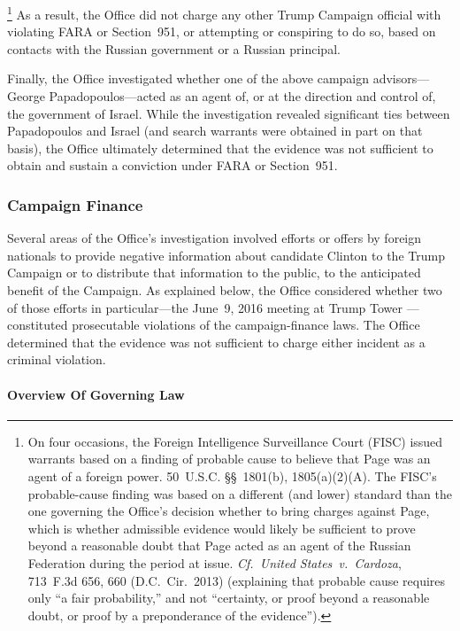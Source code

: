 \footnote{On four occasions, the Foreign Intelligence Surveillance Court (FISC) issued warrants based on a finding of probable cause to believe that Page was an agent of a foreign power.
50~U.S.C. \S\S~1801(b), 1805(a)(2)(A).
The FISC's probable-cause finding was based on a different (and lower) standard than the one governing the Office's decision whether to bring charges against Page, which is whether admissible evidence would likely be sufficient to prove beyond a reasonable doubt that Page acted as an agent of the Russian Federation during the period at issue.
\textit{Cf.~United States~v.\ Cardoza}, 713~F.3d 656, 660 (D.C.~Cir.~2013) (explaining that probable cause requires only ``a fair probability,'' and not ``certainty, or proof beyond a reasonable doubt, or proof by a preponderance of the evidence'').}
As a result, the Office did not charge  any other Trump Campaign official with violating FARA or Section~951, or attempting or conspiring to do so, based on contacts with the Russian government or a Russian principal.

Finally, the Office investigated whether one of the above campaign advisors---George Papadopoulos---acted as an agent of, or at the direction and control of, the government of Israel.
While the investigation revealed significant ties between Papadopoulos and Israel (and search warrants were obtained in part on that basis), the Office ultimately determined that the evidence was not sufficient to obtain and sustain a conviction under FARA or Section~951.

\subsubsection{Campaign Finance}
Several areas of the Office's investigation involved efforts or offers by foreign nationals to provide negative information about candidate Clinton to the Trump Campaign or to distribute that information to the public, to the anticipated benefit of the Campaign.
As explained below, the Office considered whether two of those efforts in particular---the June~9, 2016 meeting at Trump Tower ---constituted prosecutable violations of the campaign-finance laws.
The Office determined that the evidence was not sufficient to charge either incident as a criminal violation.

\paragraph{Overview Of Governing Law}


